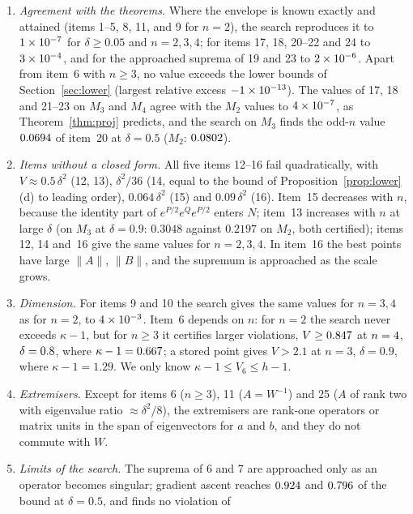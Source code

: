 \documentclass[11pt]{article}
\theoremstyle{plain}
\theoremstyle{definition}
\theoremstyle{remark}
\begin{document}
\begin{enumerate}
\item[(i)] \emph{Agreement with the theorems.} Where the envelope is known exactly and attained (items 1--5, 8, 11, and 9
for $n=2$), the search reproduces it to $1\times10^{-7}$ for $\delta\ge0.05$ and $n=2,3,4$; for items 17, 18, 20--22 and 24
to $3\times10^{-4}$, and for the approached suprema of 19 and 23 to $2\times10^{-6}$. Apart from item~6 with
$n\ge3$, no value exceeds the lower bounds of Section~\ref{sec:lower} (largest relative excess $-1\times10^{-13}$). The
values of 17, 18 and 21--23 on $M_3$ and $M_4$ agree with the $M_2$ values to $4\times10^{-7}$, as Theorem~\ref{thm:proj}
predicts, and the search on $M_3$ finds the odd-$n$ value $0.0694$ of item~20 at $\delta=0.5$ ($M_2$:
$0.0802$).
\item[(ii)] \emph{Items without a closed form.} All five items 12--16 fail quadratically, with $V\approx0.5\,\delta^2$
(12, 13), $\delta^2/36$ (14, equal to the bound of Proposition~\ref{prop:lower}(d) to leading order), $0.064\,\delta^2$ (15)
and $0.09\,\delta^2$ (16). Item~15 decreases with $n$, because the identity part of $e^{P/2}e^Qe^{P/2}$ enters $N$;
item~13 increases with $n$ at large $\delta$ (on $M_3$ at $\delta=0.9$: $0.3048$ against $0.2197$ on $M_2$, both certified);
items 12, 14 and~16 give the same values for $n=2,3,4$. In item~16 the best points have large $\|A\|$, $\|B\|$, and the supremum is
approached as the scale grows.
\item[(iii)] \emph{Dimension.} For items 9 and 10 the search gives the same values for $n=3,4$ as for $n=2$, to $4\times10^{-3}$.
Item~6 depends on $n$: for $n=2$ the search never exceeds $\kappa-1$, but for $n\ge3$ it certifies larger violations,
$V\ge0.847$ at $n=4$, $\delta=0.8$, where $\kappa-1=0.667$; a stored point gives
$V>2.1$ at $n=3$, $\delta=0.9$, where $\kappa-1=1.29$. We only know $\kappa-1\le V_6\le h-1$.
\item[(iv)] \emph{Extremisers.} Except for items 6 ($n\ge3$), 11 ($A=W^{-1}$) and 25 ($A$ of rank two with eigenvalue
ratio $\approx\delta^2/8$), the extremisers are rank-one operators or matrix units in the span of eigenvectors for $a$ and
$b$, and they do not commute with $W$.
\item[(v)] \emph{Limits of the search.} The suprema of 6 and 7 are approached only as an operator becomes singular;
gradient ascent reaches $0.924$ and $0.796$ of the bound at $\delta=0.5$, and finds no violation of

\end{enumerate}
\end{document}
